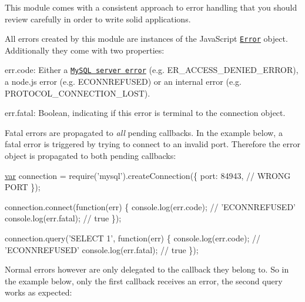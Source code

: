 This module comes with a consistent approach to error handling that you should review carefully in order to write solid applications.

All errors created by this module are instances of the Java\+Script \href{https://developer.mozilla.org/en/JavaScript/Reference/Global_Objects/Error}{\tt Error} object. Additionally they come with two properties\+:


\begin{DoxyItemize}
\item {\ttfamily err.\+code}\+: Either a \href{http://dev.mysql.com/doc/refman/5.5/en/error-messages-server.html}{\tt My\+S\+Q\+L server error} (e.\+g. {\ttfamily \textquotesingle{}E\+R\+\_\+\+A\+C\+C\+E\+S\+S\+\_\+\+D\+E\+N\+I\+E\+D\+\_\+\+E\+R\+R\+O\+R\textquotesingle{}}), a node.\+js error (e.\+g. {\ttfamily \textquotesingle{}E\+C\+O\+N\+N\+R\+E\+F\+U\+S\+E\+D\textquotesingle{}}) or an internal error (e.\+g. {\ttfamily \textquotesingle{}P\+R\+O\+T\+O\+C\+O\+L\+\_\+\+C\+O\+N\+N\+E\+C\+T\+I\+O\+N\+\_\+\+L\+O\+S\+T\textquotesingle{}}).
\item {\ttfamily err.\+fatal}\+: Boolean, indicating if this error is terminal to the connection object.
\end{DoxyItemize}

Fatal errors are propagated to {\itshape all} pending callbacks. In the example below, a fatal error is triggered by trying to connect to an invalid port. Therefore the error object is propagated to both pending callbacks\+:


\begin{DoxyCode}
\hyperlink{018__def_8c_a335628f2e9085305224b4f9cc6e95ed5}{var} connection = require(\textcolor{stringliteral}{'mysql'}).createConnection(\{
  port: 84943, \textcolor{comment}{// WRONG PORT}
\});

connection.connect(\textcolor{keyword}{function}(err) \{
  console.log(err.code); \textcolor{comment}{// 'ECONNREFUSED'}
  console.log(err.fatal); \textcolor{comment}{// true}
\});

connection.query(\textcolor{stringliteral}{'SELECT 1'}, \textcolor{keyword}{function}(err) \{
  console.log(err.code); \textcolor{comment}{// 'ECONNREFUSED'}
  console.log(err.fatal); \textcolor{comment}{// true}
\});
\end{DoxyCode}


Normal errors however are only delegated to the callback they belong to. So in the example below, only the first callback receives an error, the second query works as expected\+:


